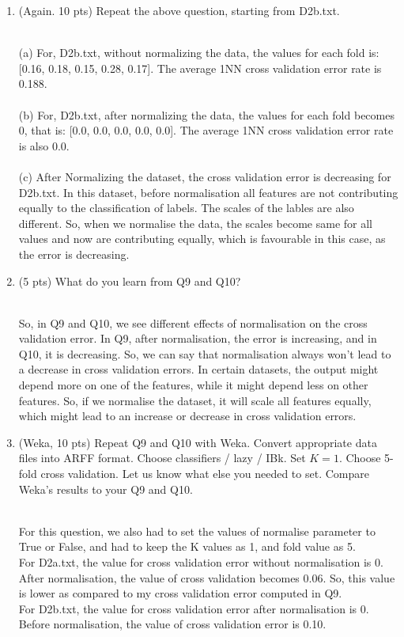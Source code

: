 \documentclass[a4paper]{article}
\theoremstyle{definition}
\newenvironment{soln}{
    \leavevmode\color{blue}\ignorespaces
}{}
\begin{document}
\begin{enumerate}
\begin{enumerate}
  \end{enumerate}


\item (Again.  10 pts)
Repeat the above question, starting from D2b.txt.
\begin{soln}
	\\(a) For, D2b.txt, without normalizing the data, the values for each fold is: [0.16, 0.18, 0.15, 0.28, 0.17]. The average 1NN cross validation error rate is 0.188.
	\\\\(b) For, D2b.txt, after normalizing the data, the values for each fold becomes 0, that is: [0.0, 0.0, 0.0, 0.0, 0.0]. The average 1NN cross validation error rate is also 0.0.
	\\\\(c) After Normalizing the dataset, the cross validation error is decreasing for D2b.txt. In this dataset, before normalisation all features are not contributing equally to the classification of labels. The scales of the lables are also different. So, when we normalise the data, the scales become same for all values and now are contributing equally, which is favourable in this case, as the error is decreasing.
\end{soln}

\item (5 pts) What do you learn from Q9 and Q10?
\begin{soln}
	\\So, in Q9 and Q10, we see different effects of normalisation on the cross validation error. In Q9, after normalisation, the error is increasing, and in Q10, it is decreasing. So, we can say that normalisation always won't lead to a decrease in cross validation errors. In certain datasets, the output might depend more on one of the features, while it might depend less on other features. So, if we normalise the dataset, it will scale all features equally, which might lead to an increase or decrease in cross validation errors.    
\end{soln}

\item (Weka, 10 pts)
Repeat Q9 and Q10 with Weka.
Convert appropriate data files into ARFF format.
Choose classifiers / lazy / IBk.
Set $K=1$.
Choose 5-fold cross validation.
Let us know what else you needed to set.  Compare Weka's results to your Q9 and Q10.
\begin{soln}
	\\For this question, we also had to set the values of normalise parameter to True or False, and had to keep the K values as 1, and fold value as 5.
	\\For D2a.txt, the value for cross validation error without normalisation is 0. After normalisation, the value of cross validation becomes 0.06. So, this value is lower as compared to my cross validation error computed in Q9. 
	\\For D2b.txt, the value for cross validation error after normalisation is 0. Before normalisation, the value of cross validation error is 0.10.

\end{soln}

\end{enumerate}


\end{document}

